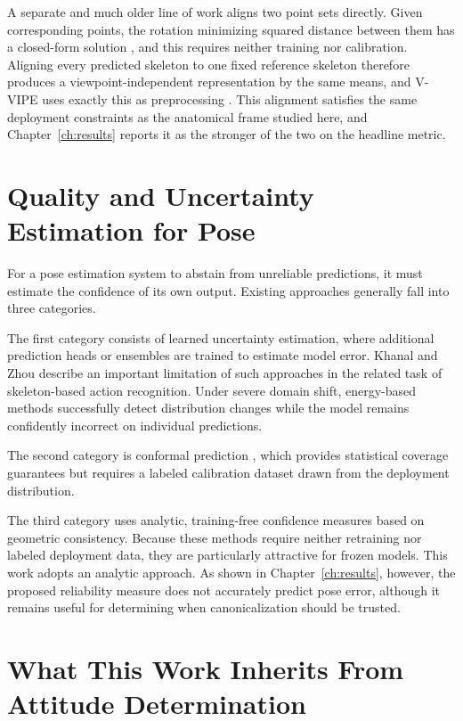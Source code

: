 \documentclass[12pt,a4paper]{report}
\begin{document}
A separate and much older line of work aligns two point sets directly. Given corresponding points, the rotation minimizing squared distance between them has a closed-form solution \cite{kabsch}, and this requires neither training nor calibration. Aligning every predicted skeleton to one fixed reference skeleton therefore produces a viewpoint-independent representation by the same means, and V-VIPE uses exactly this as preprocessing \cite{vvipe}. This alignment satisfies the same deployment constraints as the anatomical frame studied here, and Chapter~\ref{ch:results} reports it as the stronger of the two on the headline metric.

\section{Quality and Uncertainty Estimation for Pose}

For a pose estimation system to abstain from unreliable predictions, it must estimate the confidence of its own output. Existing approaches generally fall into three categories.

The first category consists of learned uncertainty estimation, where additional prediction heads or ensembles are trained to estimate model error. Khanal and Zhou \cite{khanal} describe an important limitation of such approaches in the related task of skeleton-based action recognition. Under severe domain shift, energy-based methods successfully detect distribution changes while the model remains confidently incorrect on individual predictions.

The second category is conformal prediction \cite{yangpavone}, which provides statistical coverage guarantees but requires a labeled calibration dataset drawn from the deployment distribution.

The third category uses analytic, training-free confidence measures based on geometric consistency. Because these methods require neither retraining nor labeled deployment data, they are particularly attractive for frozen models. This work adopts an analytic approach. As shown in Chapter~\ref{ch:results}, however, the proposed reliability measure does not accurately predict pose error, although it remains useful for determining when canonicalization should be trusted.

\section{What This Work Inherits From Attitude Determination}
\end{document}
